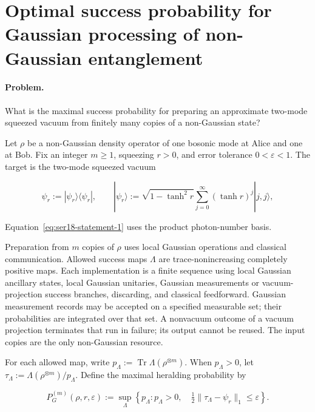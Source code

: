 \section{Optimal success probability for Gaussian processing of non-Gaussian entanglement}
\label{sec:op_6f6de1a285416bb2}

\paragraph{Problem.}
What is the maximal success probability for preparing an approximate two-mode squeezed vacuum from finitely many copies of a non-Gaussian state?

Let $\rho$ be a non-Gaussian density operator of one bosonic mode at Alice and one at Bob. Fix an integer $m\geq1$, squeezing $r>0$, and error tolerance $0<\varepsilon<1$. The target is the two-mode squeezed vacuum

\begin{equation}
\psi_r:=|\psi_r\rangle\langle\psi_r|,\qquad
|\psi_r\rangle:=\sqrt{1-\tanh^2r}\sum_{j=0}^{\infty}(\tanh r)^j|j,j\rangle,
\label{eq:ser18-statement-1}
\end{equation}

Equation~\eqref{eq:ser18-statement-1} uses the product photon-number basis.

Preparation from $m$ copies of $\rho$ uses local Gaussian operations and classical communication. Allowed success maps $\Lambda$ are trace-nonincreasing completely positive maps. Each implementation is a finite sequence using local Gaussian ancillary states, local Gaussian unitaries, Gaussian measurements or vacuum-projection success branches, discarding, and classical feedforward. Gaussian measurement records may be accepted on a specified measurable set; their probabilities are integrated over that set. A nonvacuum outcome of a vacuum projection terminates that run in failure; its output cannot be reused. The input copies are the only non-Gaussian resource.

For each allowed map, write $p_\Lambda:=\operatorname{Tr}\Lambda(\rho^{\otimes m})$. When $p_\Lambda>0$, let $\tau_\Lambda:=\Lambda(\rho^{\otimes m})/p_\Lambda$. Define the maximal heralding probability by

\begin{equation}
P_G^{(m)}(\rho,r,\varepsilon):=
\sup_{\Lambda}\left\{p_\Lambda:p_\Lambda>0,\quad
\tfrac12\|\tau_\Lambda-\psi_r\|_1\leq\varepsilon\right\}.
\label{eq:ser18-statement-2}
\end{equation}

